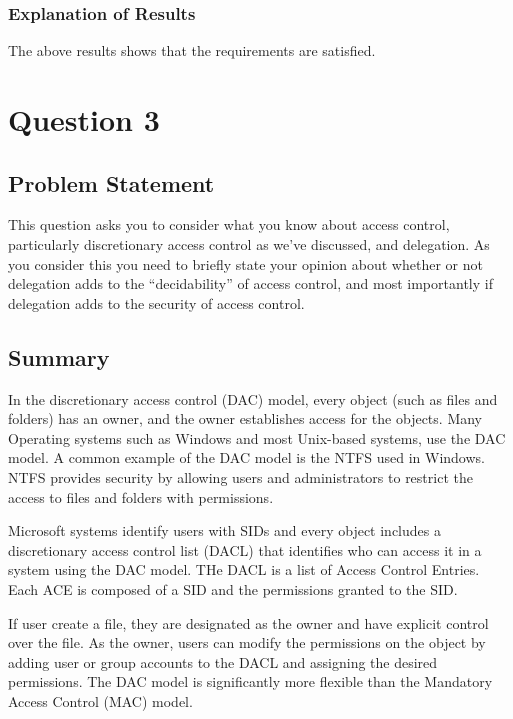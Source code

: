 \documentclass{report}
\begin{document}
\subsection{Explanation of Results}
\label{sec:explanation-results-2}
The above results shows that the requirements are satisfied.



 \chapter{Question 3}
 \label{cha:exercise-11.6.3}
  
 \section{Problem Statement}
 \label{sec:problem-statement-3}

This question asks you to consider what you know about access control, particularly
discretionary access control as we’ve discussed, and delegation. As you consider this you
need to briefly state your opinion about whether or not delegation adds to the
“decidability” of access control, and most importantly if delegation adds to the security of
access control.

\section{Summary}
\label{sec:summary-3}

In the discretionary access control (DAC) model, every object (such as files and folders) has an owner, and the owner establishes access for the objects.
Many Operating systems such as Windows and most Unix-based systems, use the DAC model.
A common example of the DAC model is the NTFS used in Windows. 
NTFS provides security by allowing users and administrators to restrict the access to files and folders with permissions.

Microsoft systems identify users with SIDs and every object includes a discretionary access control list (DACL) that identifies who can access it in a system using the DAC model. 
THe DACL is a list of Access Control Entries. Each ACE is composed of a SID and the permissions granted to the SID.

If user create a file, they are designated as the owner and have explicit control over the file. 
As the owner, users can modify the permissions on the object by adding user or group accounts to the DACL and assigning the desired permissions. 
The DAC model is significantly more flexible than the Mandatory Access Control (MAC) model.
\end{document}
